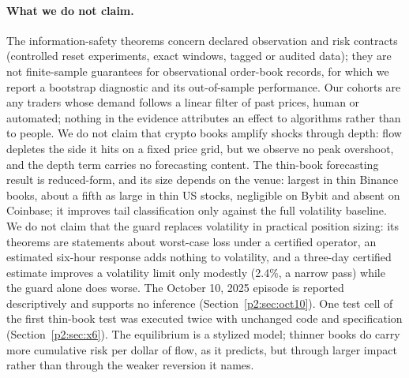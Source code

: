 \paragraph{What we do not claim.} The information-safety theorems concern declared observation and risk contracts (controlled reset experiments, exact windows, tagged or audited data); they are not finite-sample guarantees for observational order-book records, for which we report a bootstrap diagnostic and its out-of-sample performance. Our cohorts are any traders whose demand follows a linear filter of past prices, human or automated; nothing in the evidence attributes an effect to algorithms rather than to people. We do not claim that crypto books amplify shocks through depth: flow depletes the side it hits on a fixed price grid, but we observe no peak overshoot, and the depth term carries no forecasting content. The thin-book forecasting result is reduced-form, and its size depends on the venue: largest in thin Binance books, about a fifth as large in thin US stocks, negligible on Bybit and absent on Coinbase; it improves tail classification only against the full volatility baseline. We do not claim that the guard replaces volatility in practical position sizing: its theorems are statements about worst-case loss under a certified operator, an estimated six-hour response adds nothing to volatility, and a three-day certified estimate improves a volatility limit only modestly (2.4\%, a narrow pass) while the guard alone does worse. The October 10, 2025 episode is reported descriptively and supports no inference (Section~\ref{p2:sec:oct10}). One test cell of the first thin-book test was executed twice with unchanged code and specification (Section~\ref{p2:sec:x6}). The equilibrium is a stylized model; thinner books do carry more cumulative risk per dollar of flow, as it predicts, but through larger impact rather than through the weaker reversion it names.


